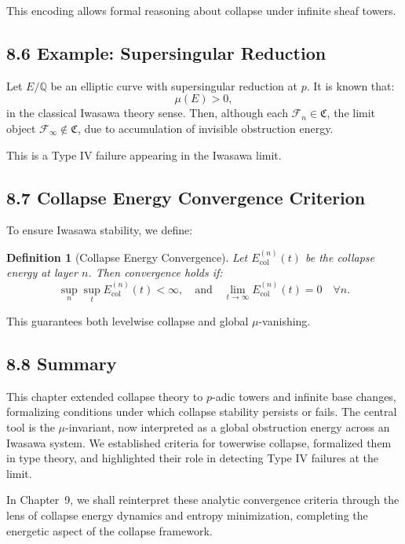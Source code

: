 \documentclass[11pt]{article}
\newtheorem{definition}[theorem]{Definition}
\begin{document}
This encoding allows formal reasoning about collapse under infinite sheaf towers.

\subsection*{8.6 Example: Supersingular Reduction}

Let \( E/\mathbb{Q} \) be an elliptic curve with supersingular reduction at \( p \). It is known that:
\[
\mu(E) > 0,
\]
in the classical Iwasawa theory sense. Then, although each \( \mathcal{F}_n \in \mathfrak{C} \), the limit object \( \mathcal{F}_\infty \notin \mathfrak{C} \), due to accumulation of invisible obstruction energy.

This is a Type IV failure appearing in the Iwasawa limit.

\subsection*{8.7 Collapse Energy Convergence Criterion}

To ensure Iwasawa stability, we define:

\begin{definition}[Collapse Energy Convergence]
Let \( E_{\mathrm{col}}^{(n)}(t) \) be the collapse energy at layer \( n \). Then convergence holds if:
\[
\sup_{n} \sup_{t} E_{\mathrm{col}}^{(n)}(t) < \infty, \quad \text{and} \quad \lim_{t \to \infty} E_{\mathrm{col}}^{(n)}(t) = 0 \quad \forall n.
\]
\end{definition}

This guarantees both levelwise collapse and global \(\mu\)-vanishing.

\subsection*{8.8 Summary}

This chapter extended collapse theory to \( p \)-adic towers and infinite base changes, formalizing conditions under which collapse stability persists or fails. The central tool is the \(\mu\)-invariant, now interpreted as a global obstruction energy across an Iwasawa system. We established criteria for towerwise collapse, formalized them in type theory, and highlighted their role in detecting Type IV failures at the limit.

In Chapter~9, we shall reinterpret these analytic convergence criteria through the lens of collapse energy dynamics and entropy minimization, completing the energetic aspect of the collapse framework.
\end{document}
